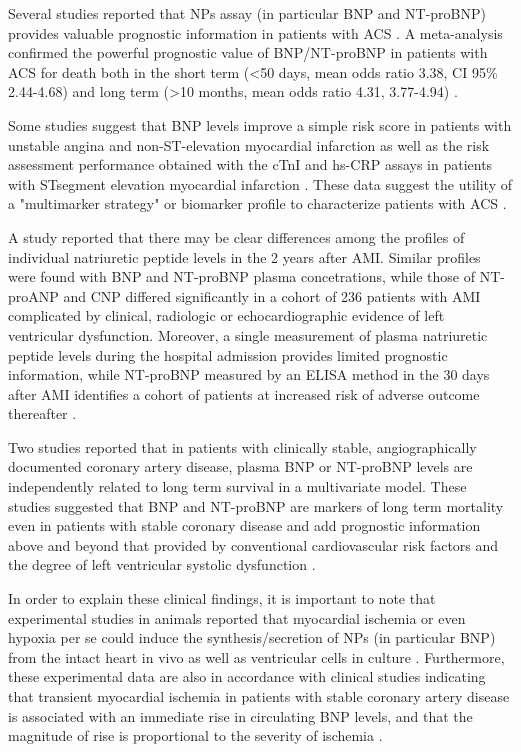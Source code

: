 \documentclass[14pt,a4paper,onecolumn]{extarticle}
\begin{document}
Several studies reported that NPs assay (in particular BNP and NT-proBNP) provides valuable prognostic information in patients with ACS \citep{bib3117} \citep{bib3138} \citep{bib3223} \citep{bib3224} \citep{bib3225} \citep{bib3226} \citep{bib3227} \citep{bib3228} \citep{bib3229} \citep{bib3230} \citep{bib3231}. A meta-analysis confirmed the powerful prognostic value of BNP/NT-proBNP in patients with ACS for death both in the short term (<50 days, mean odds ratio 3.38, CI 95\% 2.44-4.68) and long term (>10 months, mean odds ratio 4.31, 3.77-4.94) \citep{bib376}.

Some studies suggest that BNP levels improve a simple risk score in patients with unstable angina and non-ST-elevation myocardial infarction \citep{bib3239} as well as the risk assessment performance obtained with the cTnI and hs-CRP assays in patients with STsegment elevation myocardial infarction \citep{bib3234}. These data suggest the utility of a "multimarker strategy" or biomarker profile to characterize patients with ACS \citep{bib378}.

A study reported that there may be clear differences among the profiles of individual natriuretic peptide levels in the 2 years after AMI. Similar profiles were found with BNP and NT-proBNP plasma concetrations, while those of NT-proANP and CNP differed significantly in a cohort of 236 patients with AMI complicated by clinical, radiologic or echocardiographic evidence of left ventricular dysfunction. Moreover, a single measurement of plasma natriuretic peptide levels during the hospital admission provides limited prognostic information, while NT-proBNP measured by an ELISA method in the 30 days after AMI identifies a cohort of patients at increased risk of adverse outcome thereafter \citep{bib3240}.

Two  studies reported that in patients with clinically stable, angiographically documented coronary artery disease, plasma BNP \citep{bib3241} or NT-proBNP \citep{bib3242} levels are independently related to long term survival in a multivariate model. These studies suggested that BNP and NT-proBNP are markers of long term mortality even in patients with stable coronary disease and add prognostic information above and beyond that provided by conventional cardiovascular risk factors and the degree of left ventricular systolic dysfunction \citep{bib3241} \citep{bib3242}.

In order to explain these clinical findings, it is important to note that experimental studies in animals reported that myocardial ischemia or even hypoxia per se could induce the synthesis/secretion of NPs (in particular BNP) from the intact heart in vivo as well as ventricular cells in culture \citep{bib3243} \citep{bib3244}. Furthermore, these experimental data are also in accordance with  clinical studies indicating that transient myocardial ischemia in patients with stable coronary artery disease is associated with an immediate rise in circulating BNP levels, and that the magnitude of rise is proportional to the severity of ischemia \citep{bib3163} \citep{bib3164} \citep{bib3246}.
\end{document}
